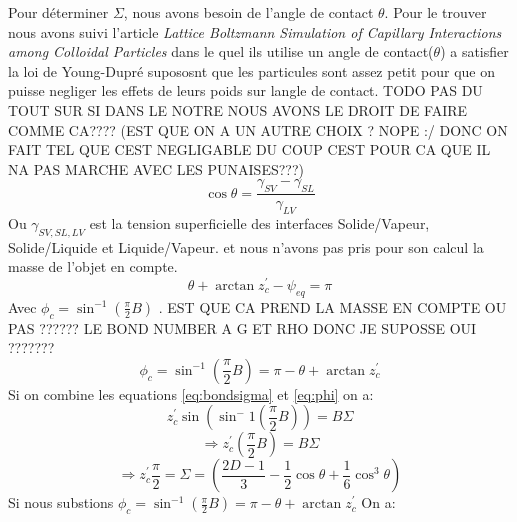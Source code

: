         Pour déterminer $\Sigma$, nous avons besoin de l'angle de contact $\theta$. Pour le trouver nous avons suivi l'article \textit{Lattice Boltzmann Simulation of Capillary Interactions among Colloidal Particles}\cite{lattice_boltzmann_caplilary_interaction} dans le quel ils utilise un angle de contact($\theta$) a satisfier la loi de Young-Dupré supososnt que les particules sont assez petit pour que on puisse negliger les effets de leurs poids sur langle de contact. TODO PAS DU TOUT SUR SI DANS LE NOTRE NOUS AVONS LE DROIT DE FAIRE COMME CA???? (EST QUE ON A UN AUTRE CHOIX ? NOPE :/ DONC ON FAIT TEL QUE CEST NEGLIGABLE DU COUP CEST POUR CA QUE IL NA PAS MARCHE AVEC LES PUNAISES???)
        \begin{equation}
            \cos \theta = \frac{\gamma_{SV}-\gamma_{SL}}{\gamma_{LV}}
        \end{equation}
        Ou $\gamma_{SV,SL,LV}$ est la tension superficielle des interfaces Solide/Vapeur, Solide/Liquide et Liquide/Vapeur.
        et nous n'avons pas pris pour son calcul la masse de l'objet en compte. 
        \begin{equation}
            \theta + \arctan z_c^{'} - \psi_{eq} = \pi 
        \end{equation}
        Avec $\phi_c = \sin^{-1}\left(\frac{\pi}{2}B\right) $ \cite{lattice_boltzmann_caplilary_interaction}. EST QUE CA PREND LA MASSE EN COMPTE OU PAS ?????? LE BOND NUMBER A G ET RHO DONC JE SUPOSSE OUI ???????
        \begin{equation}
            \phi_c = \sin^{-1}\left(\frac{\pi}{2}B\right) = \pi - \theta + \arctan z_c^{'}
            \label{eq:phi}
        \end{equation}
        Si on combine les equations \ref{eq:bondsigma} et \ref{eq:phi} on a:
        \begin{equation}
            z_c^{'} \sin \left(\sin^-1\left(\frac{\pi}{2}B\right)\right) = B \Sigma
        \end{equation}
        \begin{equation}
            \Rightarrow z_c^{'}\left(\frac{\pi}{2}B\right) = B \Sigma
        \end{equation}
        \begin{equation}
            \Rightarrow z_c^{'}\frac{\pi}{2} = \Sigma = \left(\frac{2D-1}{3}-\frac{1}{2}\cos \theta + \frac{1}{6} \cos^3 \theta\right)
            \label{eq:zcpi/2=sigma}
        \end{equation}
        Si nous substions \(\phi_c =  \sin^{-1}\left(\frac{\pi}{2}B\right) = \pi - \theta + \arctan z_c^{'} \) On a:
